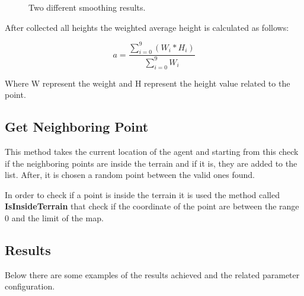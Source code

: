 \documentclass[12pt]{article}
\begin{document}
    \begin{figure}
        \centering     %
        \caption{Two different smoothing results.}
        \label{fig:SmotthingCamparison}
    \end{figure}
        
    
    After collected all heights the weighted average height is calculated as follows:

    \begin{equation}
        a = \dfrac{\sum\limits_{i=0}^{9} (W_i * H_i) }{ \sum\limits_{i=0}^{9} W_i }
    \end{equation}

    \noindent
    Where W represent the weight and H represent the height value related to the point. 

    \subsection{Get Neighboring Point}
    This method takes the current location of the agent and starting from this check if the neighboring points are inside the terrain and if it is, they are added to the list.
    After, it is chosen a random point between the valid ones found.

    In order to check if a point is inside the terrain it is used the method called \textbf{IsInsideTerrain} that check if the coordinate of the point are between the range 0 and
    the limit of the map.

    \subsection{Results}
    Below there are some examples of the results achieved and the related parameter configuration.
\end{document}
